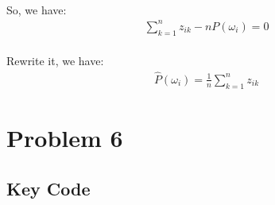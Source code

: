 \documentclass[]{article}
\begin{document}
            \paragraph{}So, we have:
            \begin{align*}
            \sum_{k=1}^n{z_{ik}} - nP(\omega_i) = 0
            \end{align*}
            \paragraph{}Rewrite it, we have:
            \begin{align*}
\hat{P}(\omega_i) = \frac{1}{n}\sum_{k=1}^n{z_{ik}}
            \end{align*}
            
    
    \section{Problem 6}
        \subsection{Key Code}
            
\end{document}
